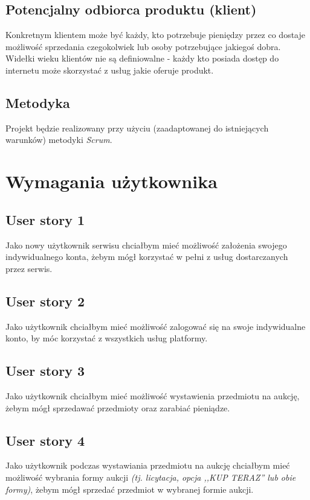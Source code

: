 \documentclass[a4paper]{article}
\begin{document}
	\subsection{Potencjalny odbiorca produktu (klient)}
	
	Konkretnym klientem może być każdy, kto potrzebuje pieniędzy przez co dostaje możliwość sprzedania czegokolwiek lub osoby potrzebujące jakiegoś dobra. Widełki wieku klientów nie są definiowalne - każdy kto posiada dostęp do internetu może skorzystać z usług jakie oferuje produkt.
	
	\subsection{Metodyka}
	
	Projekt będzie realizowany przy użyciu (zaadaptowanej do istniejących warunków) metodyki {\em Scrum}. 
	
	\section{Wymagania użytkownika}
	
	\subsection{User story 1}
	Jako nowy użytkownik serwisu chciałbym mieć możliwość założenia swojego indywidualnego konta, żebym mógł korzystać w pełni z usług dostarczanych przez serwis.
	
	\subsection{User story 2}
	Jako użytkownik chciałbym mieć możliwość zalogować się na swoje indywidualne konto, by móc korzystać z wszystkich usług platformy.
	
	\subsection{User story 3}
	Jako użytkownik chciałbym mieć możliwość wystawienia przedmiotu na aukcję, żebym mógł sprzedawać przedmioty oraz zarabiać pieniądze.
	
	\subsection{User story 4}
	Jako użytkownik podczas wystawiania przedmiotu na aukcję chciałbym mieć możliwość wybrania formy aukcji \emph{(tj. licytacja, opcja ,,KUP TERAZ'' lub obie formy)}, żebym mógł sprzedać przedmiot w wybranej formie aukcji.
	
\end{document}
